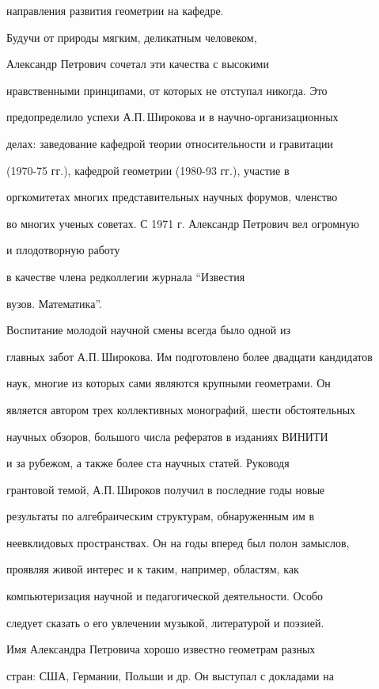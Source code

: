 направления развития геометрии на кафедре.



Будучи от природы мягким, деликатным человеком,

Александр Петрович сочетал эти качества с высокими

нравственными принципами, от которых не отступал никогда. Это

предопределило успехи А.П.\,Широкова и в научно-организационных

делах: заведование кафедрой теории относительности и гравитации

(1970-75 гг.), кафедрой геометрии (1980-93 гг.), участие в

оргкомитетах многих представительных научных форумов, членство

во многих ученых советах. С 1971 г. Александр Петрович вел огромную

и плодотворную работу

в качестве члена редколлегии журнала ``Известия

вузов. Математика''.



Воспитание молодой научной смены всегда было одной из

главных забот А.П.\,Широкова. Им подготовлено более двадцати кандидатов

наук, многие из которых сами являются крупными геометрами. Он

является автором трех коллективных монографий, шести обстоятельных

научных обзоров, большого числа рефератов в изданиях ВИНИТИ

и за рубежом, а также более ста научных статей. Руководя

грантовой темой, А.П.\,Широков получил в последние годы новые

результаты по алгебраическим структурам, обнаруженным им в

неевклидовых пространствах. Он на годы вперед был полон замыслов,

проявляя живой интерес и к таким, например, областям, как

компьютеризация научной и педагогической деятельности. Особо

следует сказать о его увлечении музыкой, литературой и поэзией.



Имя Александра Петровича хорошо известно геометрам разных

стран: США, Германии, Польши и др. Он выступал с докладами на

